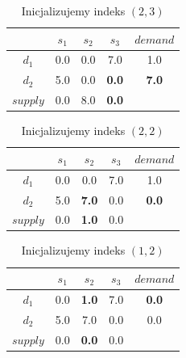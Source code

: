 \documentclass{beamer}
\begin{document}
\begin{frame}
 {
    \begin{table}
        \begin{center}
            \begin{tabular}{c||ccc||c}
                & $s_1$ & $s_2$ & $s_3$ & $demand$ \\ 
                \hline
                \hline
                $d_1$ & 0.0 & 0.0 & 7.0 & 1.0 \\
                $d_2$ & 5.0 & 0.0 & \textbf{0.0} & \textbf{7.0} \\
                \hline
                \hline
                $supply$ & 0.0 & 8.0 & \textbf{0.0} & \\ 
            \end{tabular}
        \end{center}
        \caption{Inicjalizujemy indeks $(2,3)$}
    \end{table}
}

 {
    \begin{table}
        \begin{center}
            \begin{tabular}{c||ccc||c}
                & $s_1$ & $s_2$ & $s_3$ & $demand$ \\ 
                \hline
                \hline
                $d_1$ & 0.0 & 0.0 & 7.0 & 1.0 \\
                $d_2$ & 5.0 & \textbf{7.0} & 0.0 & \textbf{0.0} \\
                \hline
                \hline
                $supply$ & 0.0 & \textbf{1.0} & 0.0 & \\ 
            \end{tabular}
        \end{center}
        \caption{Inicjalizujemy indeks $(2,2)$}
    \end{table}
}

 {
    \begin{table}
        \begin{center}
            \begin{tabular}{c||ccc||c}
                & $s_1$ & $s_2$ & $s_3$ & $demand$ \\ 
                \hline
                \hline
                $d_1$ & 0.0 & \textbf{1.0} & 7.0 & \textbf{0.0} \\
                $d_2$ & 5.0 & 7.0 & 0.0 & 0.0 \\
                \hline
                \hline
                $supply$ & 0.0 & \textbf{0.0} & 0.0 & \\ 
            \end{tabular}
        \end{center}
        \caption{Inicjalizujemy indeks $(1,2)$}
    \end{table}
}


\end{frame}
\end{document}
